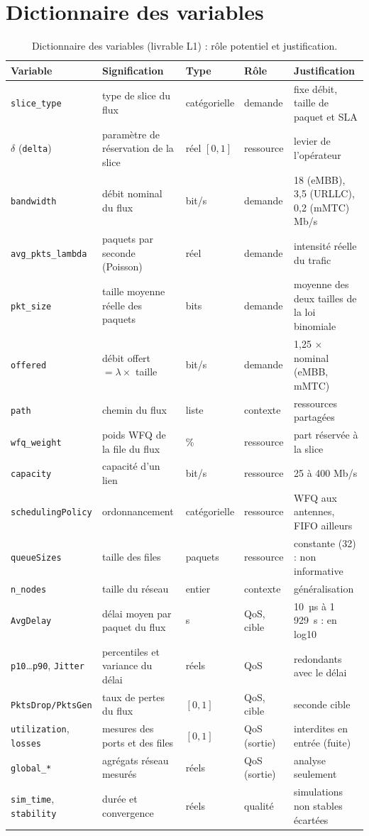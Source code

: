 \documentclass[11pt,a4paper]{report}
\begin{document}
\section{Dictionnaire des variables}
\begin{table}[H]
\centering\scriptsize
\begin{tabularx}{\linewidth}{@{}>{\raggedright}p{2.6cm}>{\raggedright}p{3.6cm}>{\raggedright}p{1.7cm}>{\raggedright}p{1.5cm}X@{}}
\toprule
Variable & Signification & Type & Rôle & Justification\\
\midrule
\texttt{slice\_type} & type de slice du flux & catégorielle & demande & fixe débit, taille de paquet et SLA\\
$\delta$ (\texttt{delta}) & paramètre de réservation de la slice & réel $[0,1]$ & ressource & levier de l'opérateur\\
\texttt{bandwidth} & débit nominal du flux & bit/s & demande & 18 (eMBB), 3,5 (URLLC), 0,2 (mMTC) Mb/s\\
\texttt{avg\_pkts\_lambda} & paquets par seconde (Poisson) & réel & demande & intensité réelle du trafic\\
\texttt{pkt\_size} & taille moyenne réelle des paquets & bits & demande & moyenne des deux tailles de la loi binomiale\\
\texttt{offered} & débit offert $=\lambda\times$ taille & bit/s & demande & 1,25 $\times$ nominal (eMBB, mMTC)\\
\texttt{path} & chemin du flux & liste & contexte & ressources partagées\\
\texttt{wfq\_weight} & poids WFQ de la file du flux & \% & ressource & part réservée à la slice\\
\texttt{capacity} & capacité d'un lien & bit/s & ressource & 25 à 400 Mb/s\\
\texttt{schedulingPolicy} & ordonnancement & catégorielle & ressource & WFQ aux antennes, FIFO ailleurs\\
\texttt{queueSizes} & taille des files & paquets & ressource & constante (32) : non informative\\
\texttt{n\_nodes} & taille du réseau & entier & contexte & généralisation\\
\texttt{AvgDelay} & délai moyen par paquet du flux & s & QoS, cible & 10~µs à 1\,929~s : en log10\\
\texttt{p10}…\texttt{p90}, \texttt{Jitter} & percentiles et variance du délai & réels & QoS & redondants avec le délai\\
\texttt{PktsDrop/PktsGen} & taux de pertes du flux & $[0,1]$ & QoS, cible & seconde cible\\
\texttt{utilization}, \texttt{losses} & mesures des ports et des files & $[0,1]$ & QoS (sortie) & interdites en entrée (fuite)\\
\texttt{global\_*} & agrégats réseau mesurés & réels & QoS (sortie) & analyse seulement\\
\texttt{sim\_time}, \texttt{stability} & durée et convergence & réels & qualité & simulations non stables écartées\\
\bottomrule
\end{tabularx}
\caption{Dictionnaire des variables (livrable L1) : rôle potentiel et justification.}
\label{tab:dico}
\end{table}
\end{document}
